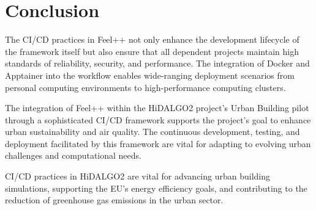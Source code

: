 \documentclass[runningheads]{llncs}
\begin{document}
\section{Conclusion}
The CI/CD practices in Feel++ not only enhance the development lifecycle of the framework itself but also ensure that all dependent projects maintain high standards of reliability, security, and performance. The integration of Docker and Apptainer into the workflow enables wide-ranging deployment scenarios from personal computing environments to high-performance computing clusters.

The integration of Feel++ within the HiDALGO2 project's Urban Building pilot through a sophisticated CI/CD framework supports the project's goal to enhance urban sustainability and air quality. The continuous development, testing, and deployment facilitated by this framework are vital for adapting to evolving urban challenges and computational needs.

CI/CD practices in HiDALGO2 are vital for advancing urban building simulations, supporting the EU's energy efficiency goals, and contributing to the reduction of greenhouse gas emissions in the urban sector.
\end{document}
